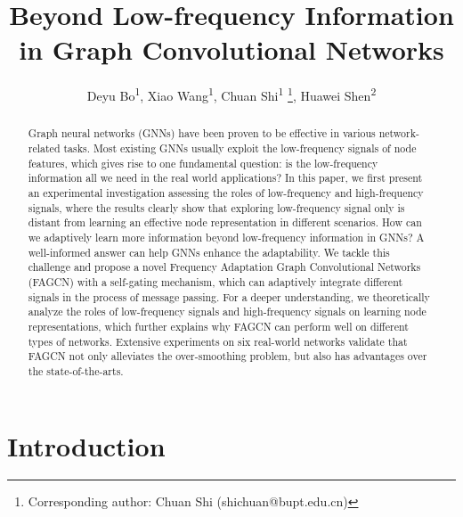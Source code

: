 \documentclass[letterpaper]{article} %
\title{Beyond Low-frequency Information in Graph Convolutional Networks}
\author{
	Deyu Bo\textsuperscript{\rm 1},
	Xiao Wang\textsuperscript{\rm 1},
	Chuan Shi\textsuperscript{\rm 1}	\thanks{Corresponding author: Chuan Shi (shichuan@bupt.edu.cn)},
	Huawei Shen\textsuperscript{\rm 2}
}
\begin{document}
\maketitle

\begin{abstract}
Graph neural networks (GNNs) have been proven to be effective in various network-related tasks. Most existing GNNs usually exploit the low-frequency signals of node features, which gives rise to one fundamental question: is the low-frequency information all we need in the real world applications?
In this paper, we first present an experimental investigation assessing the roles of low-frequency and high-frequency signals, where the results clearly show that exploring low-frequency signal only is distant from learning an effective node representation in different scenarios. How can we adaptively learn more information beyond low-frequency information in GNNs? A well-informed answer can help GNNs enhance the adaptability. We tackle this challenge and propose a novel Frequency Adaptation Graph Convolutional Networks (FAGCN) with a self-gating mechanism, which can adaptively integrate different signals in the process of message passing.
For a deeper understanding, we theoretically analyze the roles of low-frequency signals and high-frequency signals on learning node representations, which further explains why FAGCN can perform well on different types of networks.
Extensive experiments on six real-world networks validate that FAGCN not only alleviates the over-smoothing problem, but also has advantages over the state-of-the-arts.
\end{abstract}

\section{Introduction}
\label{introduction}
\end{document}
